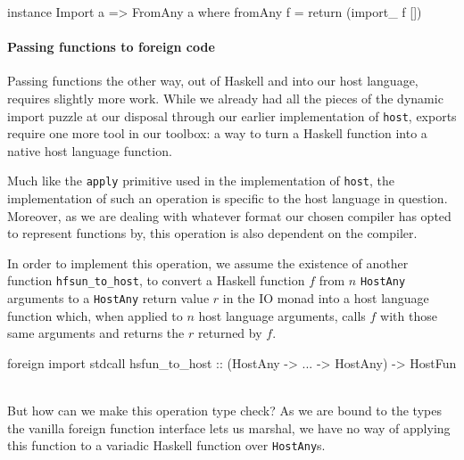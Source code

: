 \documentclass{sigplanconf}
\begin{document}
\begin{code}
instance Import a => FromAny a where
  fromAny f = return (import_ f [])
\end{code}

\paragraph{Passing functions to foreign code}
Passing functions the other way, out of Haskell and into our host language,
requires slightly more work. While we already had all the pieces of the
dynamic import puzzle at our disposal through our earlier implementation of
\lstinline!host!, exports require one more tool in our toolbox: a way to turn
a Haskell function into a native host language function.

Much like the \lstinline!apply! primitive used in the implementation of
\lstinline!host!, the implementation of such an operation is specific to the
host language in question. Moreover, as we are dealing with whatever format
our chosen compiler has opted to represent functions by, this operation is also
dependent on the compiler.

In order to implement this operation, we assume the existence of another
function \lstinline!hfsun_to_host!, to convert a Haskell function $f$ from $n$
\lstinline!HostAny! arguments to a \lstinline!HostAny! return value $r$ in the
IO monad into a host language function which, when applied to $n$ host
language arguments, calls $f$ with those same arguments and returns the $r$
returned by $f$.\\
\begin{code}
foreign import stdcall hsfun_to_host
  :: (HostAny -> ... -> HostAny) -> HostFun
\end{code}\\
But how can we make this operation type check?
As we are bound to the types the vanilla foreign function interface lets us
marshal, we have no way of applying this function to a variadic Haskell
function over \lstinline!HostAny!s.
\end{document}
